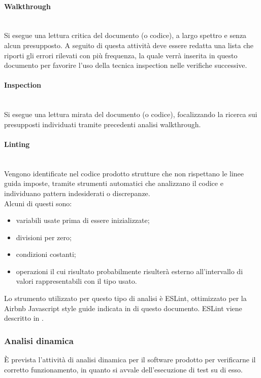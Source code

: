 \paragraph{Walkthrough} \mbox{}\\
Si esegue una lettura critica del documento (o codice), a largo spettro e senza alcun presupposto. A seguito di questa attività deve essere redatta una lista che riporti gli errori rilevati con più frequenza, la quale verrà inserita in questo documento per favorire l'uso della tecnica inspection nelle verifiche successive.

\paragraph{Inspection} \mbox{}\\
Si esegue una lettura mirata del documento (o codice), focalizzando la ricerca sui presupposti individuati tramite precedenti analisi walkthrough.

\paragraph{Linting}\mbox{}\\
Vengono identificate nel codice prodotto strutture che non rispettano le linee guida imposte, tramite strumenti automatici che analizzano il codice e individuano pattern indesiderati o discrepanze.\\
Alcuni di questi sono:\begin{itemize}
	\item variabili usate prima di essere inizializzate;  
	\item divisioni per zero;
	\item condizioni costanti;
	\item operazioni il cui risultato probabilmente risulterà esterno all'intervallo di valori rappresentabili con il tipo usato.
\end{itemize}
Lo strumento utilizzato per questo tipo di analisi è ESLint, ottimizzato per la Airbnb Javascript style guide indicata in  di questo documento. ESLint viene descritto in .

\subsubsection{Analisi dinamica}
È prevista l’attività di analisi dinamica per il software prodotto per verificarne il corretto funzionamento, in quanto si avvale dell'esecuzione di test su di esso.

















